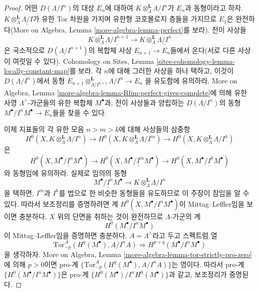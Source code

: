 \begin{proof}
어떤 $D(\Lambda/I^n)$의 대상 $E_n$에 대하여
$K \otimes_\Lambda^\mathbf{L} \underline{\Lambda/I^n}$가
$\underline{E_n}$과 동형이라고 하자.
$K \otimes_\Lambda^\mathbf{L} \underline{\Lambda/I}$가 유한 Tor 차원을
가지며 유한형 코호몰로지 층들을 가지므로 $E_1$은 완전하다(More on
Algebra, Lemma \ref{more-algebra-lemma-perfect}를 보라). 전이 사상들
$$
K \otimes_\Lambda^\mathbf{L} \underline{\Lambda/I^{n + 1}}
\to
K \otimes_\Lambda^\mathbf{L} \underline{\Lambda/I^n}
$$
은 국소적으로 $D(\Lambda/I^{n + 1})$의 복합체 사상
$E_{n + 1} \to E_n$들에서 온다(서로 다른 사상이 여럿일 수 있다).
Cohomology on Sites, Lemma
\ref{sites-cohomology-lemma-locally-constant-map}를 보라. 각 $n$에 대해
그러한 사상을 하나 택하고, 이것이 $D(\Lambda/I^n)$에서 동형
$E_{n + 1} \otimes_{\Lambda/I^{n + 1}}^\mathbf{L} \Lambda/I^n \to E_n$
을 유도함에 유의하라. More on Algebra, Lemma
\ref{more-algebra-lemma-Rlim-perfect-gives-complete}에 의해 유한 사영
$\Lambda^\wedge$-가군들의 유한 복합체 $M^\bullet$과, 전이 사상들과
양립하는 $D(\Lambda/I^n)$의 동형
$M^\bullet/I^nM^\bullet \to E_n$들을 찾을 수 있다.

\medskip\noindent
이제 지표들의 각 유한 모음 $n > m > k$에 대해 사상들의 삼중항
$$
H^0(X, K \otimes_\Lambda^\mathbf{L} \Lambda/I^n)
\to
H^0(X, K \otimes_\Lambda^\mathbf{L} \Lambda/I^m)
\to
H^0(X, K \otimes_\Lambda^\mathbf{L} \Lambda/I^k)
$$
은
$$
H^0(X, \underline{M^\bullet/I^nM^\bullet})
\to
H^0(X, \underline{M^\bullet/I^mM^\bullet})
\to
H^0(X, \underline{M^\bullet/I^kM^\bullet})
$$
와 동형임에 유의하라. 실제로 임의의 동형
$$
\underline{M^\bullet/I^nM^\bullet} \to
K \otimes_\Lambda^\mathbf{L} \Lambda/I^n
$$
을 택하면,
$I^m$과 $I^k$를 법으로 한 비슷한 동형들을 유도하므로 이 주장이
참임을 알 수 있다. 따라서 보조정리를 증명하려면 계
$H^0(X, \underline{M^\bullet/I^nM^\bullet})$이 Mittag--Leffler임을
보이면 충분하다. $X$ 위의 단면을 취하는 것이 완전하므로
$\Lambda$-가군의 계
$$
H^0(M^\bullet/I^nM^\bullet)
$$
이 Mittag--Leffler임을 증명하면 충분하다. $A = \Lambda^\wedge$라고
두고 스펙트럼 열
$$
\text{Tor}_{-p}^A(H^q(M^\bullet), A/I^nA) \Rightarrow
H^{p + q}(M^\bullet/I^nM^\bullet)
$$
을 생각하자. More on Algebra, Lemma
\ref{more-algebra-lemma-tor-strictly-pro-zero}에 의해 $p > 0$이면
pro-계 $\{\text{Tor}_{-p}^A(H^q(M^\bullet), A/I^nA)\}$는 영이다.
따라서 pro-계 $\{H^0(M^\bullet/I^nM^\bullet)\}$은 pro-계
$\{H^0(M^\bullet)/I^nH^0(M^\bullet)\}$과 같고, 보조정리가 증명된다.
\end{proof}

